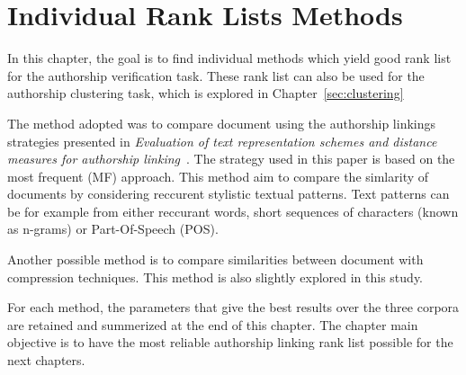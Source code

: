 \section{Individual Rank Lists Methods}

In this chapter, the goal is to find individual methods which yield good rank list for the authorship verification task.
These rank list can also be used for the authorship clustering task, which is explored in Chapter~\ref{sec:clustering}

The method adopted was to compare document using the authorship linkings strategies presented in \textit{Evaluation of text representation schemes and distance measures for authorship linking}~\cite{kocher_verification}.
The strategy used in this paper is based on the most frequent (MF) approach.
This method aim to compare the simlarity of documents by considering reccurent stylistic textual patterns.
Text patterns can be for example from either reccurant words, short sequences of characters (known as n-grams) or Part-Of-Speech (POS).

Another possible method is to compare similarities between document with compression techniques.
This method is also slightly explored in this study.

For each method, the parameters that give the best results over the three corpora are retained and summerized at the end of this chapter.
The chapter main objective is to have the most reliable authorship linking rank list possible for the next chapters.







